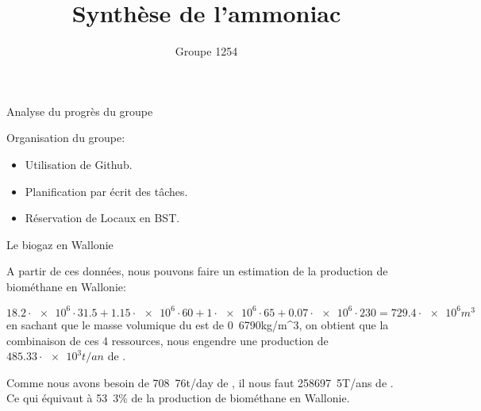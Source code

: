 \documentclass{beamer}
\begin{document}
\title{Synthèse de l'ammoniac}
\author{Groupe 1254}
\date{}
\maketitle

\begin{frame}{Analyse du progrès du groupe}

		\begin{center}
		Organisation du groupe:
			\begin{itemize}
			\item Utilisation de Github.
			\item Planification par écrit des tâches.
			\item Réservation de Locaux en BST.
			\end{itemize}
		\end{center}

\end{frame}

\begin{frame}[allowframebreaks]{Le biogaz en Wallonie}
		\begin{center}
\end{center}


A partir de ces données, nous pouvons faire un estimation de la production de biométhane en Wallonie:

$$18.2\cdot \num{e6} \cdot 31.5 + 1.15\cdot \num{e6} \cdot 60 + 1\cdot \num{e6} \cdot 65 + 0.07\cdot \num{e6} \cdot 230 = \unit{729.4\cdot \num{e6}}{m^3}$$ en sachant que le masse volumique du  est de \unit{0.6790}{kg/m^3},
on obtient que la combinaison de ces 4 ressources, nous engendre une production de $\unit{485.33 \cdot \num{e3}}{t/an}$ de .

Comme nous avons besoin de \unit{708.76}{t/day} de , il nous faut \unit{258697.5}{T/ans} de . Ce qui équivaut à \unit{53.3}{\%} de la production de biométhane en Wallonie.

\end{frame}
\end{document}
